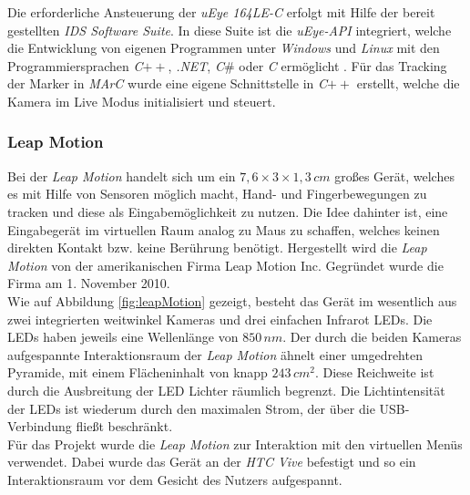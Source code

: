 Die erforderliche Ansteuerung der \textit{uEye 164LE-C} erfolgt mit Hilfe der bereit gestellten \textit{IDS Software Suite}. In diese Suite ist die \textit{uEye-API} integriert, welche die Entwicklung von eigenen Programmen unter \textit{Windows} und \textit{Linux} mit den Programmiersprachen \textit{C}$++$, \textit{.NET}, \textit{C$\#$} oder \textit{C} ermöglicht \cite{website:IDSSuite}. Für das Tracking der Marker in \textit{MArC} wurde eine eigene Schnittstelle in \textit{C}$++$ erstellt, welche die Kamera im Live Modus initialisiert und steuert. 


\subsubsection{Leap Motion}\label{sec:LeapMotion} 	
Bei der \textit{Leap Motion} \cite{website:LeapMotion} handelt sich um ein $7,6\times3\times1,3\,cm$ großes Gerät, welches es mit Hilfe von Sensoren möglich macht, Hand- und Fingerbewegungen zu tracken und diese als Eingabemöglichkeit zu nutzen. Die Idee dahinter ist, eine Eingabegerät im virtuellen Raum analog zu Maus zu schaffen, welches keinen direkten Kontakt bzw. keine Berührung benötigt. Hergestellt wird die \textit{Leap Motion} von der amerikanischen Firma Leap Motion Inc. Gegründet wurde die Firma am 1. November 2010. \\
Wie auf Abbildung \ref{fig:leapMotion} gezeigt, besteht das Gerät im wesentlich aus zwei integrierten weitwinkel Kameras und drei einfachen Infrarot LEDs. Die LEDs haben jeweils eine Wellenlänge von $850\,nm$. Der durch die beiden Kameras aufgespannte Interaktionsraum der \textit{Leap Motion} ähnelt einer umgedrehten Pyramide, mit einem Flächeninhalt von knapp $243\,cm{^2}$. Diese Reichweite ist durch die Ausbreitung der LED Lichter räumlich begrenzt. Die Lichtintensität der LEDs ist wiederum durch den maximalen Strom, der über die USB-Verbindung fließt beschränkt.\\
Für das Projekt wurde die \textit{Leap Motion} zur Interaktion mit den virtuellen Menüs verwendet. Dabei wurde das Gerät an der \textit{HTC Vive} befestigt und so ein Interaktionsraum vor dem Gesicht des Nutzers aufgespannt.

